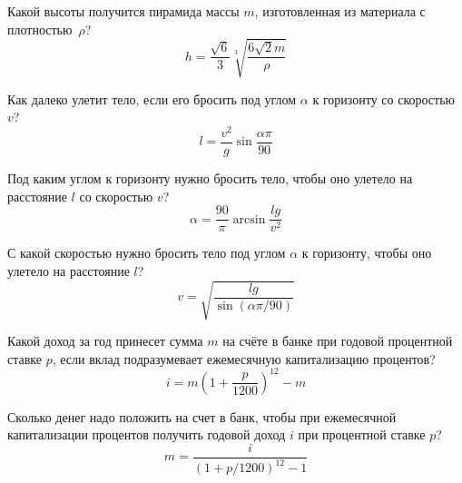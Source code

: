 \begin{zztask}
Какой высоты получится пирамида массы $m$, изготовленная из
материала с плотностью~$\rho$?
%
\[
h = \frac{\sqrt6}{3} \sqrt[3]{\frac{6\sqrt2 m}{\rho}}
\]
\end{zztask}


\begin{zztask}
Как далеко улетит тело, если его бросить под углом $\alpha$ к горизонту
со скоростью $v$?
%
\[
l = \frac{v^2}{g}\sin\frac{\alpha\pi}{90}
\]
\end{zztask}


\begin{zztask}
Под каким углом к горизонту нужно бросить тело, чтобы оно улетело на
расстояние $l$ со скоростью $v$?
%
\[
\alpha = \frac{90}{\pi}\arcsin\frac{lg}{v^2}
\]
\end{zztask}


\begin{zztask}
С какой скоростью нужно бросить тело под углом $\alpha$ к горизонту,
чтобы оно улетело на расстояние $l$?
%
\[
v = \sqrt{\frac{lg}{\sin(\alpha\pi/90)}}
\]
\end{zztask}


\begin{zztask}
Какой доход за год принесет сумма $m$ на счёте в банке при годовой
процентной ставке $p$, если вклад подразумевает ежемесячную
капитализацию процентов?
%
\[
i = m \left(1 + \frac{p}{1200}\right)^{12} - m
\]
\end{zztask}


\begin{zztask}
Сколько денег надо положить на счет в банк, чтобы при ежемесячной
капитализации процентов получить годовой доход $i$ при процентной
ставке $p$?
%
\[
m = \frac{i}{\left(1 + p/1200\right)^{12} - 1}
\]
\end{zztask}


